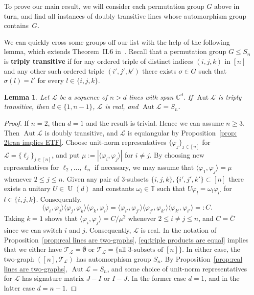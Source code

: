 \documentclass[11pt]{article}
\newtheorem{lemma}[theo]{Lemma}
\theoremstyle{definition}
\numberwithin{equation}{section}
\begin{document}
To prove our main result, we will consider each permutation group $G$ above in turn, and find all instances of doubly transitive lines whose automorphism group contains~$G$.

We can quickly cross some groups off our list with the help of the following lemma, which extends Theorem~II.6 in~\cite{King:19}.
Recall that a permutation group $G \leq S_n$ is \textbf{triply transitive} if for any ordered triple of distinct indices $(i,j,k)$ in $[n]$ and any other such ordered triple $(i',j',k')$ there exists $\sigma \in G$ such that $\sigma(l) = l'$ for every $l \in \{ i,j,k\}$.

\begin{lemma}
\label{lem.3tran}
Let $\mathscr{L}$ be a sequence of $n>d$ lines with span $\mathbb{C}^d$.
If $\operatorname{Aut} \mathscr{L}$ is triply transitive, then $d\in\{1,n-1\}$, $\mathscr{L}$ is real, and $\operatorname{Aut} \mathscr{L} =S_n$.
\end{lemma}

\begin{proof}
If $n=2$, then $d=1$ and the result is trivial.
Hence we can assume $n \geq 3$.
Then $\operatorname{Aut} \mathscr{L}$ is doubly transitive, and $\mathscr{L}$ is equiangular by Proposition~\ref{prop: 2tran implies ETF}.
Choose unit-norm representatives $\{ \varphi_j \}_{j\in [n]}$ for $\mathscr{L} = \{ \ell_j \}_{j\in [n]}$, and put $\mu := | \langle \varphi_i, \varphi_j \rangle|$ for $i \neq j$.
By choosing new representatives for $\ell_2,\dotsc,\ell_n$ if necessary, we may assume that $\langle \varphi_1,\varphi_j \rangle = \mu$ whenever $2 \leq j \leq n$.
Given any pair of 3-subsets $\{i,j,k\}, \{i',j',k'\} \subset [n]$ there exists a unitary $U \in \operatorname{U}(d)$ and constants $\omega_l \in \mathbb{T}$ such that $U \varphi_l = \omega_l \varphi_{l'}$ for $l \in \{ i,j,k\}$.
Consequently,
\begin{equation}
\label{eq:triple products are equal}
\langle \varphi_i, \varphi_j \rangle \langle \varphi_j, \varphi_k \rangle \langle \varphi_k, \varphi_i \rangle = \langle \varphi_{i'}, \varphi_{j'} \rangle \langle \varphi_{j'}, \varphi_{k'} \rangle \langle \varphi_{k'}, \varphi_{i'} \rangle =: C.
\end{equation}
Taking $k=1$ shows that $\langle \varphi_i, \varphi_j \rangle = C/\mu^2$ whenever $2 \leq i\neq j \leq n$, and $C = \overline{C}$ since we can switch $i$ and $j$.
Consequently, $\mathscr{L}$ is real.
In the notation of Proposition~\ref{prop:real lines are two-graphs}, \eqref{eq:triple products are equal} implies that we either have $\mathcal{T}_{\mathscr{L}} = \emptyset$ or $\mathcal{T}_{\mathscr{L}} = \{ \text{all 3-subsets of }[n]\}$.
In either case, the two-graph $([n],\mathcal{T}_{\mathscr{L}})$ has automorphism group $S_n$.
By Proposition~\ref{prop:real lines are two-graphs}, $\operatorname{Aut}\mathscr{L} = S_n$, and some choice of unit-norm representatives for $\mathscr{L}$ has signature matrix $J-I$ or $I-J$.
In the former case $d=1$, and in the latter case $d=n-1$.
\end{proof}
\end{document}
